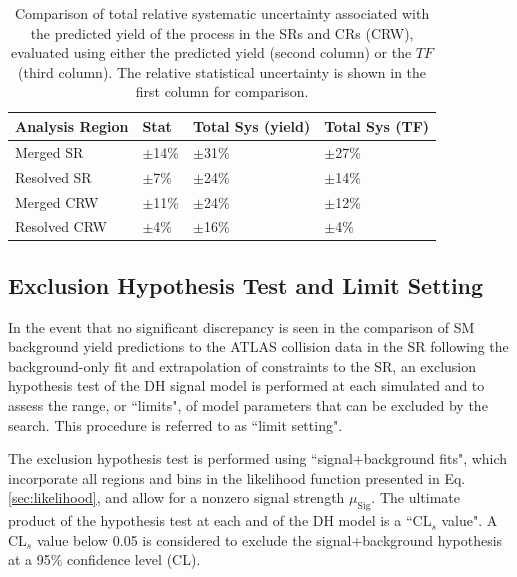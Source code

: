 \begin{table}[ht]
\begin{center}
\caption{\label{tab:TF_sys_comp} Comparison of total relative systematic uncertainty associated with the predicted yield of the \wjets process in the SRs and \wjets CRs (CRW), evaluated using either the predicted yield (second column) or the \(TF\) (third column). The relative statistical uncertainty is shown in the first column for comparison.}
\begin{tabular}{l l l l }
\toprule
\textbf{Analysis Region} &\textbf{Stat} &\textbf{Total Sys (yield)} & \textbf{Total Sys (TF)} \tabularnewline
\midrule
\midrule
Merged SR & \(\pm\)14\% & \(\pm\)31\% & \(\pm\)27\% \tabularnewline
\midrule
Resolved SR & \(\pm\)7\% & \(\pm\)24\% & \(\pm\)14\% \tabularnewline
\midrule
Merged CRW & \(\pm\)11\% & \(\pm\)24\% & \(\pm\)12\% \tabularnewline
\midrule
Resolved CRW & \(\pm\)4\% & \(\pm\)16\% & \(\pm\)4\% \tabularnewline
\bottomrule
\end{tabular}
\end{center}
\end{table}

\subsection{Exclusion Hypothesis Test and Limit Setting}
\label{sec:hypo_test}

In the event that no significant discrepancy is seen in the comparison of SM background yield predictions to the ATLAS collision data in the SR following the background-only fit and extrapolation of constraints to the SR, an exclusion hypothesis test of the DH signal model is performed at each simulated \ms and \mZp to assess the range, or ``limits", of model parameters that can be excluded by the search. This procedure is referred to as ``limit setting".

The exclusion hypothesis test is performed using ``signal+background fits", which incorporate all regions and bins in the likelihood function presented in Eq. \ref{sec:likelihood}, and allow for a nonzero signal strength \(\mu_\text{Sig}\). The ultimate product of the hypothesis test at each \ms and \mZp of the DH model is a ``CL\(_s\) value". A CL\(_s\) value below 0.05 is considered to exclude the signal+background hypothesis at a 95\% confidence level (CL).

